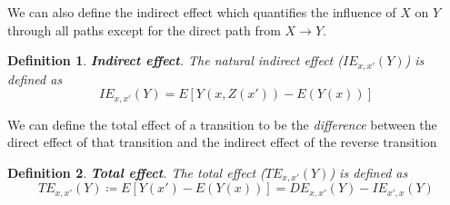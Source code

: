 \documentclass[11pt]{article}
\numberwithin{equation}{section}
\newcommand{\defeq}{\coloneqq}
\newtheorem{defn}{Definition}[section]
\begin{document}
We can also define the indirect effect which quantifies the influence of $X$ on $Y$ through all paths except for the direct path from $X \rightarrow Y$.
\begin{defn}
\textbf{Indirect effect}. The natural indirect effect ($IE_{x,x'}(Y)$) is defined as
\begin{equation}
IE_{x,x'}(Y) = E[Y(x, Z(x')) - E(Y(x))]
\end{equation}
\end{defn}
We can define the total effect of a transition to be the \textit{difference} between the direct effect of that transition and the indirect effect of the reverse transition
\begin{defn}
\textbf{Total effect}. The total effect ($TE_{x,x'}(Y)$) is defined as
\begin{equation}
TE_{x,x'}(Y) \defeq E[Y(x') - E(Y(x))] = DE_{x,x'}(Y) - IE_{x',x}(Y)
\end{equation}
\end{defn}


\newpage
 
\end{document}
